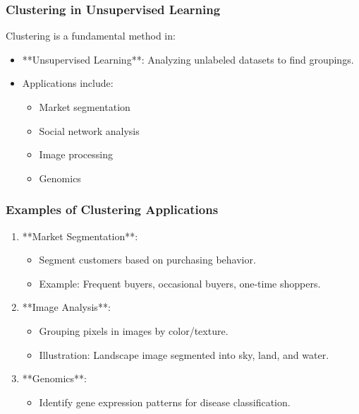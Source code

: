 \documentclass[aspectratio=169]{beamer}
\begin{document}
\begin{frame}[fragile]
    \frametitle{Clustering in Unsupervised Learning}
    Clustering is a fundamental method in:
    \begin{itemize}
        \item **Unsupervised Learning**: Analyzing unlabeled datasets to find groupings.
        \item Applications include:
            \begin{itemize}
                \item Market segmentation
                \item Social network analysis
                \item Image processing
                \item Genomics
            \end{itemize}
    \end{itemize}
\end{frame}

\begin{frame}[fragile]
    \frametitle{Examples of Clustering Applications}
    \begin{enumerate}
        \item **Market Segmentation**:
            \begin{itemize}
                \item Segment customers based on purchasing behavior.
                \item Example: Frequent buyers, occasional buyers, one-time shoppers.
            \end{itemize}
        \item **Image Analysis**:
            \begin{itemize}
                \item Grouping pixels in images by color/texture.
                \item Illustration: Landscape image segmented into sky, land, and water.
            \end{itemize}
        \item **Genomics**:
            \begin{itemize}
                \item Identify gene expression patterns for disease classification.
            \end{itemize}
    \end{enumerate}
\end{frame}
\end{document}
